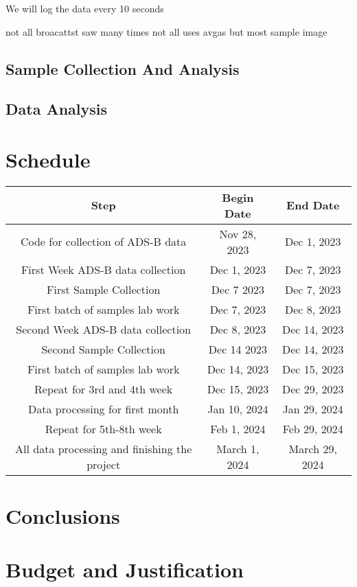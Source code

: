 \documentclass[12pt]{article}
\begin{document}
We will log the data every 10 seconds 

not all broacattst saw many times
not all uses avgas but most
sample image


\subsection{Sample Collection And Analysis}

\subsection{Data Analysis}
\section{Schedule}
\begin{center}
\begin{tabular}{|c|c|c|}
 \hline
 \textbf{Step} & \textbf{Begin Date} & \textbf{End Date} \\
 \hline \hline
Code for collection of ADS-B data & Nov 28, 2023 & Dec 1, 2023 \\
\hline
First Week ADS-B data collection & Dec 1, 2023 & Dec 7, 2023 \\
\hline
First Sample Collection & Dec 7 2023 & Dec 7, 2023 \\
\hline
First batch of samples lab work & Dec 7, 2023 & Dec 8, 2023 \\ 
\hline
Second Week ADS-B data collection & Dec 8, 2023 & Dec 14, 2023 \\
\hline
Second Sample Collection & Dec 14 2023 & Dec 14, 2023 \\
\hline
First batch of samples lab work & Dec 14, 2023 & Dec 15, 2023 \\ 
\hline
Repeat for 3rd and 4th week & Dec 15, 2023 & Dec 29, 2023\\
 \hline
Data processing for first month& Jan 10, 2024& Jan 29, 2024\\
 \hline
 Repeat for 5th-8th week& Feb 1, 2024 & Feb 29, 2024\\
  \hline
All data processing and finishing the project& March 1, 2024 & March 29, 2024\\
\hline
\end{tabular}
\end{center}
\section{Conclusions}
\section{Budget and Justification}

\newpage
\printbibliography
\end{document}
